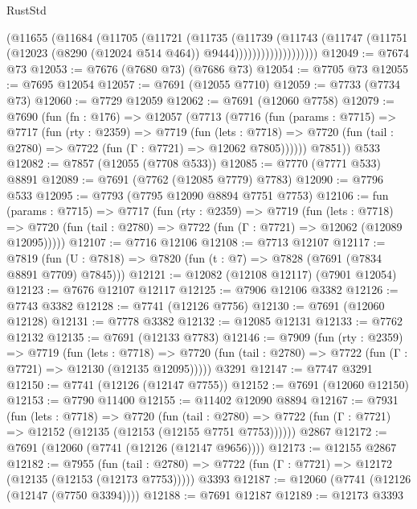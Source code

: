 \begin{lexlean}{RustStd}
\begin{coremodule}
                      (@11655
                        (@11684
                          (@11705
                            (@11721
                              (@11735
                                (@11739
                                  (@11743
                                    (@11747
                                      (@11751
                                        (@12023 (@8290 (@12024 @514 @464)) @9444)))))))))))))))))))
@12049 := @7674 @73
@12053 := @7676 (@7680 @73) (@7686 @73)
@12054 := @7705 @73
@12055 := @7695 @12054
@12057 := @7691 (@12055 @7710)
@12059 := @7733 (@7734 @73)
@12060 := @7729 @12059
@12062 := @7691 (@12060 @7758)
@12079 := @7690
    (fun (fn : @176) =>
    @12057
      (@7713
        (@7716
          (fun (params : @7715) =>
          @7717
            (fun (rty : @2359) =>
            @7719
              (fun (lets : @7718) =>
              @7720 (fun (tail : @2780) => @7722 (fun (Γ : @7721) => @12062 @7805))))))
        @7851))
    @533
@12082 := @7857 (@12055 (@7708 @533))
@12085 := @7770 (@7771 @533) @8891
@12089 := @7691 (@7762 (@12085 @7779) @7783)
@12090 := @7796 @533
@12095 := @7793 (@7795 @12090 @8894 @7751 @7753)
@12106 := fun (params : @7715) =>
  @7717
    (fun (rty : @2359) =>
    @7719
      (fun (lets : @7718) =>
      @7720 (fun (tail : @2780) => @7722 (fun (Γ : @7721) => @12062 (@12089 @12095)))))
@12107 := @7716 @12106
@12108 := @7713 @12107
@12117 := @7819 (fun (U : @7818) => @7820 (fun (t : @7) => @7828 (@7691 (@7834 @8891 @7709) @7845)))
@12121 := @12082 (@12108 @12117) (@7901 @12054)
@12123 := @7676 @12107 @12117
@12125 := @7906 @12106 @3382
@12126 := @7743 @3382
@12128 := @7741 (@12126 @7756)
@12130 := @7691 (@12060 @12128)
@12131 := @7778 @3382
@12132 := @12085 @12131
@12133 := @7762 @12132
@12135 := @7691 (@12133 @7783)
@12146 := @7909
    (fun (rty : @2359) =>
    @7719
      (fun (lets : @7718) =>
      @7720 (fun (tail : @2780) => @7722 (fun (Γ : @7721) => @12130 (@12135 @12095)))))
    @3291
@12147 := @7747 @3291
@12150 := @7741 (@12126 (@12147 @7755))
@12152 := @7691 (@12060 @12150)
@12153 := @7790 @11400
@12155 := @11402 @12090 @8894
@12167 := @7931
    (fun (lets : @7718) =>
    @7720
      (fun (tail : @2780) =>
      @7722 (fun (Γ : @7721) => @12152 (@12135 (@12153 (@12155 @7751 @7753))))))
    @2867
@12172 := @7691 (@12060 (@7741 (@12126 (@12147 @9656))))
@12173 := @12155 @2867
@12182 := @7955
    (fun (tail : @2780) => @7722 (fun (Γ : @7721) => @12172 (@12135 (@12153 (@12173 @7753)))))
    @3393
@12187 := @12060 (@7741 (@12126 (@12147 (@7750 @3394))))
@12188 := @7691 @12187
@12189 := @12173 @3393

\end{coremodule}
\end{lexlean}

